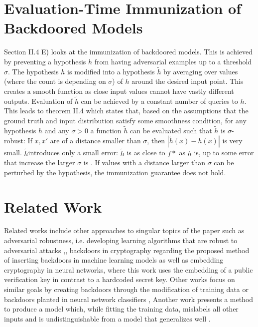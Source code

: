 \documentclass[
	fontsize=12pt,
	headings=small,
	parskip=quarter,
	bibliography=totoc,
	numbers=noenddot,       
	open=any,               
 	final                   
]{scrreprt}
\begin{document}
\section{Evaluation-Time Immunization of Backdoored Models}
Section II.4 E) looks at the immunization of backdoored models. This is achieved by preventing a hypothesis $h$ from having adversarial examples up to a threshold $\sigma$. The hypothesis $h$ is modified into a hypothesis $\tilde{h}$ by averaging over values (where the count is depending on $\sigma$) of $h$ around the desired input point. This creates a smooth function as close input values cannot have vastly different outputs. Evaluation of $\tilde{h}$ can be achieved by a constant number of queries to $h$. This leads to theorem II.4 which states that, based on the assumptions that the ground truth and input distribution satisfy some smoothness condition, for any hypothesis $h$ and any $\sigma > 0$ a function $\tilde{h}$ can be evaluated such that  $\tilde{h}$ is $\sigma$-robust: If $x,x'$ are of a distance smaller than $\sigma$, then $|\tilde{h}(x)-h(x)|$ is very small. $\tilde{h}$introduces only a small error: $\tilde{h}$ is as close to $f*$ as $h$ is, up to some error that increase the larger $\sigma$ is \cite{goldwasser2022backdoors}.  If values with a distance larger than $\sigma$ can be perturbed by the hypothesis, the immunization guarantee does not hold.  



\section{Related Work}
Related works include other approaches to singular topics of the paper such as adversarial robustness, i.e. developing learning algorithms that are robust to adversarial attacks \cite{pmlr-v117-garg20a},\cite{pmlr-v97-bubeck19a}, backdoors in cryptography regarding the proposed method of inserting backdoors in machine learning models \cite{4031390} as well as embedding cryptography in neural networks, where this work uses the embedding of a public verification key in contrast to a hardcoded secret key. Other works focus on similar goals by creating backdoors through the modification of training data or backdoors planted in neural network classifiers \cite{8685687}, \cite{NEURIPS2022_3538a22c} Another work presents a method to produce a model which, while fitting the training data, mislabels all other inputs and is undistinguishable from a model that generalizes well \cite{moitra2022spoofinggeneralizationcanttrust}. 




\end{document}
